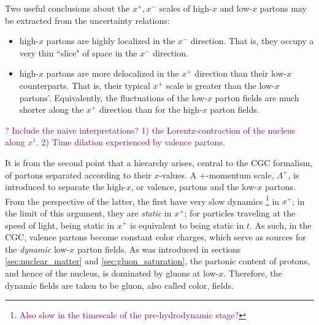 Two useful conclusions about the $x^+,x^-$  scales of high-$x$ and low-$x$ partons may be extracted from the uncertainty relations:
\begin{itemize}
	\item[1)] high-$x$ partons are highly localized in the $x^-$ direction. That is, they occupy a very thin ``slice" of space in the $x^-$ direction.
	\item[2)] high-$x$ partons are more delocalized in the $x^+$ direction than their low-$x$ counterparts. That is, their typical $x^+$ scale %
is greater than the low-$x$ partons'. Equivalently, the fluctuations of the low-$x$ parton fields are much shorter along the $x^+$ direction than for the high-$x$ parton fields.
\end{itemize}

\textcolor{purple}{? Include the naive \cite{Lappi_notes} interpretations? 1) the Lorentz-contraction of the nucleus along $x^1$. 2) Time dilation experienced by valence partons.}

It is from the second point that a hierarchy arises, central to the \gls{CGC} formalism, of partons separated according to their $x$-values. A $+$-momentum scale, $\Lambda^+$, is introduced to separate the high-$x$, or valence, partons and the low-$x$ partons. From the perspective of the latter, the first have very slow dynamics\textcolor{red}{ \footnote{\textcolor{purple}{Also slow in the timescale of the pre-hydrodynamic stage?}}} in $x^+$; in the limit of this argument, they are \emph{static} in $x^+$; for particles traveling at the speed of light, being static in $x^+$ is equivalent to being static in $t$. As such, in the \gls{CGC}, valence partons become constant color charges, which serve as sources for the \emph{dynamic} low-$x$ parton fields.
As was introduced in sections \ref{sec:nuclear_matter} and \ref{sec:gluon_saturation}, the partonic content of protons, and hence of the nucleus, is dominated by gluons at low-$x$. Therefore, the dynamic fields are taken to be gluon, also called color, fields.


